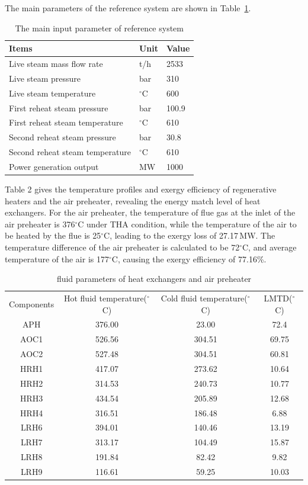 \documentclass[preprint,12pt]{elsarticle}
\begin{document}
The main  parameters of the reference system are shown in Table~\ref{tab:ref input}.

\begin{table}[htbp]
\caption{The main input parameter of reference system }
\label{tab:ref input}
\centering
\begin{tabular}{lll}
\toprule 
Items & Unit & Value\tabularnewline
\midrule
 Live steam mass flow rate 	    	&t/h 			&2533 \\
 Live steam pressure 		    	&bar 			&310\\
 Live steam temperature		     	&$^\circ$C		&600		\\
 First reheat steam pressure    	&bar			&100.9		\\
 First reheat steam temperature  	&$^\circ$C		&610		\\
 Second reheat steam pressure    	&bar			&30.8		\\
 Second reheat steam temperature 	&$^\circ$C		&610		\\
 Power generation output 			&MW				&1000		\\
\bottomrule
\end{tabular}	
\end{table}
Table 2 gives the temperature profiles and exergy efficiency of regenerative heaters and the air preheater, revealing the energy match level of heat exchangers.
For the air preheater, the temperature of flue gas at the inlet of the air preheater is 376$^\circ$C under THA condition, while the temperature of the air to be heated by the flue is 25$^\circ$C, leading to the exergy loss of 27.17\,MW. The temperature difference of the air preheater is calculated to be 72$^\circ$C, and average temperature of the air is 177$^\circ$C, causing the exergy efficiency of 77.16\%.
\begin{table}[htbp]
\caption{fluid parameters of heat exchangers and air preheater}
\label{tab:reheater parameter}
\centering
\begin{tabular}{cccc}
\toprule 
\multirow{2}{2cm}{Components} &\multirow{2}{2.7cm}{Hot fluid temperature($^\circ$C)}  & \multirow{2}{2.7cm}{Cold fluid temperature($^\circ$C)}&  \multirow{2}{2.5cm}{LMTD($^\circ$C)}\tabularnewline
&&&\tabularnewline
\midrule
APH  &  376.00 	& 23.00  & 72.4\tabularnewline
AOC1 &   526.56 & 304.51 & 69.75\tabularnewline
AOC2 &  527.48 	& 304.51 & 60.81\tabularnewline
HRH1 &   417.07 & 273.62 & 10.64\tabularnewline
HRH2 &   314.53 & 240.73 & 10.77\tabularnewline
HRH3 &   434.54 & 205.89 & 12.68\tabularnewline
HRH4 &   316.51 & 186.48 & 6.88\tabularnewline
LRH6 &  394.01 	& 140.46 & 13.19\tabularnewline
LRH7 &   313.17 & 104.49 & 15.87\tabularnewline
LRH8 &   191.84 & 82.42  & 9.82\tabularnewline
LRH9 &   116.61 & 59.25  & 10.03\tabularnewline
\bottomrule
\end{tabular}
\end{table}
\end{document}
